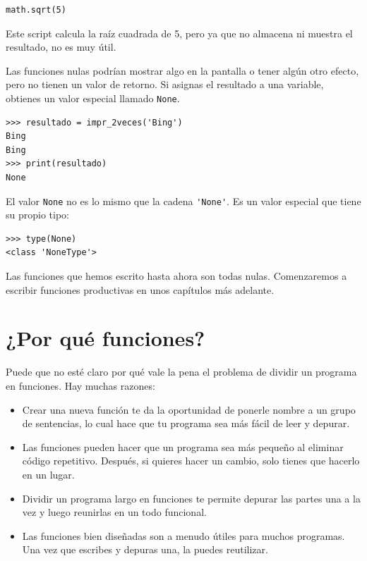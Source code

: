 \documentclass[10pt]{book}
\begin{document}
\begin{verbatim}
math.sqrt(5)
\end{verbatim}
%
Este script calcula la raíz cuadrada de 5, pero ya que no almacena
ni muestra el resultado, no es muy útil.

Las funciones nulas podrían mostrar algo en la pantalla o tener algún
otro efecto, pero no tienen un valor de retorno.  Si
asignas el resultado a una variable, obtienes un valor especial llamado
{\tt None}.

\begin{verbatim}
>>> resultado = impr_2veces('Bing')
Bing
Bing
>>> print(resultado)
None
\end{verbatim}
%
El valor {\tt None} no es lo mismo que la cadena \verb"'None'".
Es un valor especial que tiene su propio tipo:

\begin{verbatim}
>>> type(None)
<class 'NoneType'>
\end{verbatim}
%
Las funciones que hemos escrito hasta ahora son todas nulas.  Comenzaremos
a escribir funciones productivas en unos capítulos más adelante.


\section{¿Por qué funciones?}

Puede que no esté claro por qué vale la pena el problema de dividir
un programa en funciones.  Hay muchas razones:

\begin{itemize}

\item Crear una nueva función te da la oportunidad de ponerle nombre a un grupo
de sentencias, lo cual hace que tu programa sea más fácil de leer y depurar.

\item Las funciones pueden hacer que un programa sea más pequeño al eliminar código
repetitivo.  Después, si quieres hacer un cambio, solo tienes
que hacerlo en un lugar.

\item Dividir un programa largo en funciones te permite depurar las
partes una a la vez y luego reunirlas en un todo funcional.

\item Las funciones bien diseñadas son a menudo útiles para muchos programas.
Una vez que escribes y depuras una, la puedes reutilizar.

\end{itemize}
\end{document}

